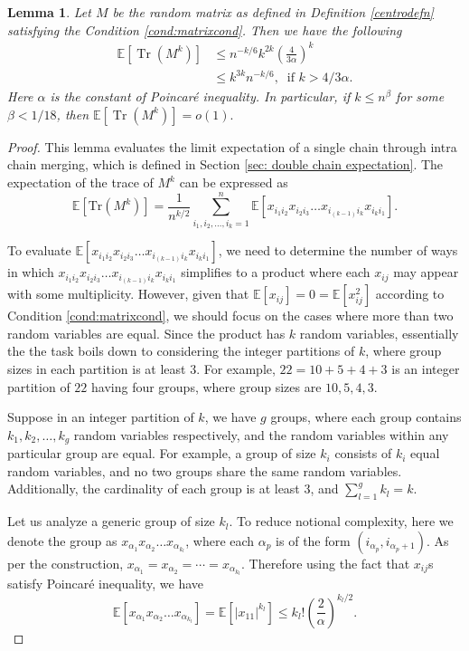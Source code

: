 \documentclass[12pt]{amsart}
\theoremstyle{plain}
\newtheorem{lemma}[Thm]{Lemma}
\theoremstyle{definition}
\newcommand{\Tr}{\operatorname{Tr}}
\begin{document}
\begin{lemma}{\label{lemma: one_chain_complex}}
Let $M$ be the random matrix as defined in Definition \ref{centrodefn} satisfying the Condition \ref{cond:matrixcond}. Then we have the following
\begin{align*}
    \mathbb{E}[\Tr(M^k)] &\leq n^{-k/6}k^{2k}\left(\frac{4}{3\alpha}\right)^{k}\\
    &\leq  k^{3k}n^{-k/6},\;\;\text{if $k>4/3\alpha$}.
\end{align*}
Here $\alpha$ is the constant of Poincar\'e inequality. In particular, if $k\leq n^{\beta}$ for some $\beta < 1/18$, then $\mathbb{E}[\Tr(M^k)]=o(1).$
\end{lemma}
\begin{proof}
This lemma evaluates the limit expectation of a single chain through intra chain merging, which is defined in Section \ref{sec: double chain expectation}. The expectation of the trace of $M^{k}$ can be expressed as
$$
\mathbb{E}[\text{Tr}(M^{k})] = \frac{1}{n^{ k/2 }}\sum_{i_{1},i_{2},\dots,i_{k}=1}^{n}\mathbb{E}[x_{i_{1}i_{2}}x_{i_{2}i_{3}} \dots x_{i_{(k-1)}i_{k}}x_{i_{k}i_{1}}].
$$


To evaluate $\mathbb{E}[x_{i_{1}i_{2}}x_{i_{2}i_{3}} \dots x_{i_{(k-1)}i_{k}}x_{i_{k}i_{1}}]$, we need to determine the number of ways in which $x_{i_{1}i_{2}}x_{i_{2}i_{3}} \dots x_{i_{(k-1)}i_{k}}x_{i_{k}i_{1}}$ simplifies to a product where each $x_{ij}$ may appear with some multiplicity. However, given that $\mathbb{E}[x_{ij}]=0 = \mathbb{E}[x_{ij}^{2}]$ according to Condition \ref{cond:matrixcond}, we should focus on the cases where more than two random variables are equal. Since the product has $k$ random variables, essentially the the task boils down to considering the integer partitions of $k$, where group sizes in each partition is at least $3$. For example, $22=10+5+4+3$ is an integer partition of $22$ having four groups, where group sizes are $10,5,4,3.$

Suppose in an integer partition of $k$, we have $g$ groups, where each group contains $k_1, k_2, \dots, k_g$ random variables respectively, and the random variables within any particular group are equal. For example, a group of size $k_i$ consists of $k_i$ equal random variables, and no two groups share the same random variables. Additionally, the cardinality of each group is at least 3, and $\sum_{l=1}^{g} k_l = k$. 

Let us analyze a generic group of size $k_{l}.$ To reduce notional complexity, here we denote the group as $x_{\alpha_{1}}x_{\alpha_{2}}\ldots x_{\alpha_{k_{l}}}$, where each $\alpha_{p}$ is of the form $(i_{\alpha_{p}}, i_{\alpha_{p}+1}).$ As per the construction, $x_{\alpha_{1}} = x_{\alpha_{2}} = \cdots = x_{\alpha_{k_{l}}}.$ Therefore using the fact that $x_{ij}$s satisfy Poincar\'e inequality, we have $$\mathbb{E}[x_{\alpha_{1}}x_{\alpha_{2}}\ldots x_{\alpha_{k_{l}}}]= \mathbb{E}[|x_{11}|^{k_{l}}]\leq k_{l}!\left(\frac{2}{\alpha}\right)^{k_{l}/2}.$$


\end{proof}
\end{document}
